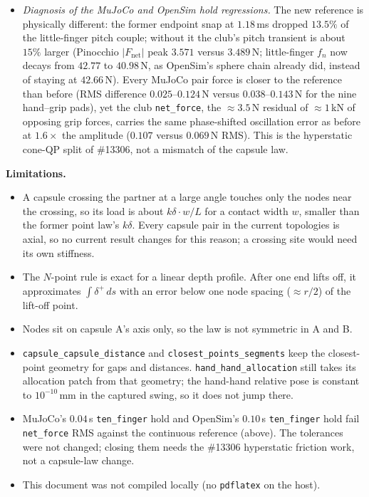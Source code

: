 \documentclass[11pt,a4paper]{article}
\begin{document}
\begin{itemize}[leftmargin=*,noitemsep]
  at $3.682\% / 1.911\%$.
\item \emph{Diagnosis of the MuJoCo and OpenSim hold regressions.} The new reference is physically different: the
  former endpoint snap at $1.18$\,ms dropped $13.5\%$ of the little-finger pitch couple; without it the club's
  pitch transient is about $15\%$ larger (Pinocchio $|F_{\mathrm{net}}|$ peak $3.571$ versus $3.489$\,N; little-finger
  $f_n$ now decays from $42.77$ to $40.98$\,N, as OpenSim's sphere chain already did, instead of staying at
  $42.66$\,N). Every MuJoCo pair force is closer to the reference than before (RMS difference $0.025$--$0.124$\,N
  versus $0.038$--$0.143$\,N for the nine hand--grip pads), yet the club \texttt{net\_force}, the $\approx 3.5$\,N
  residual of $\approx 1$\,kN of opposing grip forces, carries the same phase-shifted oscillation error as before at
  $1.6\times$ the amplitude ($0.107$ versus $0.069$\,N RMS). This is the hyperstatic cone-QP split of \#13306, not a
  mismatch of the capsule law.
\end{itemize}

\textbf{Limitations.}
\begin{itemize}[leftmargin=*,noitemsep]
\item A capsule crossing the partner at a large angle touches only the nodes near the crossing, so its load is about
  $k\delta \cdot w/L$ for a contact width $w$, smaller than the former point law's $k\delta$. Every capsule pair in the
  current topologies is axial, so no current result changes for this reason; a crossing site would need its own stiffness.
\item The $N$-point rule is exact for a linear depth profile. After one end lifts off, it approximates
  $\int\delta^+\,ds$ with an error below one node spacing ($\approx r/2$) of the lift-off point.
\item Nodes sit on capsule A's axis only, so the law is not symmetric in A and B.
\item \texttt{capsule\_capsule\_distance} and \texttt{closest\_points\_segments} keep the closest-point geometry for gaps
  and distances. \texttt{hand\_hand\_allocation} still takes its allocation patch from that geometry; the hand-hand
  relative pose is constant to $10^{-10}$\,mm in the captured swing, so it does not jump there.
\item MuJoCo's $0.04$\,s \texttt{ten\_finger} hold and OpenSim's $0.10$\,s \texttt{ten\_finger} hold fail \texttt{net\_force}
  RMS against the continuous reference (above). The tolerances were not changed; closing them needs the \#13306
  hyperstatic friction work, not a capsule-law change.
\item This document was not compiled locally (no \texttt{pdflatex} on the host).
\end{itemize}
\end{document}
